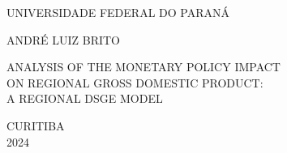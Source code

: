 \documentclass[../thesis.tex]{subfiles}
\begin{document}
	
	\begin{center}
	
	
	UNIVERSIDADE FEDERAL DO PARANÁ
	
	\vspace*{2cm}
	
	
	ANDRÉ LUIZ BRITO %
	
	\vspace*{5cm}
	
	ANALYSIS OF THE MONETARY POLICY IMPACT \\
	ON REGIONAL GROSS DOMESTIC PRODUCT: \\
	A REGIONAL DSGE MODEL


	\vfill
	
	CURITIBA \\	
	2024
	
	\vspace*{1cm}
	
	\end{center}
	
	\thispagestyle{empty}
	
	\newpage
	
\end{document}
